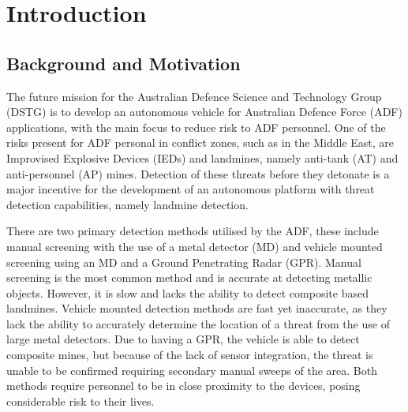 \documentclass[main.tex]{subfiles}
\begin{document}

\chapter{Introduction}

\section{Background and Motivation}
The future mission for the Australian Defence Science and Technology Group (DSTG) is to develop an autonomous vehicle for Australian Defence Force (ADF) applications, with the main focus to reduce risk to ADF personnel. One of the risks present for ADF personal in conflict zones, such as in the Middle East, are Improvised Explosive Devices (IEDs) and landmines, namely anti-tank (AT) and anti-personnel (AP) mines. Detection of these threats before they detonate is a major incentive for the development of an autonomous platform with threat detection capabilities, namely landmine detection.
\\
% 
% 
%
%
%

There are two primary detection methods utilised by the ADF, these include manual screening with the use of a metal detector (MD) and vehicle mounted screening using an MD and a Ground Penetrating Radar (GPR). Manual screening is the most common method and is accurate at detecting metallic objects. However, it is slow and lacks the ability to detect composite based landmines. Vehicle mounted detection methods are fast yet inaccurate, as they lack the ability to accurately determine the location of a threat from the use of large metal detectors. Due to having a GPR, the vehicle is able to detect composite mines, but because of the lack of sensor integration, the threat is unable to be confirmed requiring secondary manual sweeps of the area. Both methods require personnel to be in close proximity to the devices, posing considerable risk to their lives. %
\\
%
%
\end{document}
